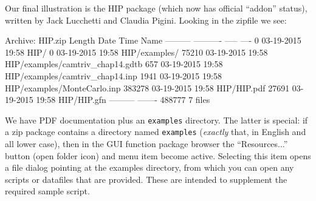 \documentclass[oneside]{book}
\begin{document}
Our final illustration is the \textsf{HIP} package (which now has
official ``addon'' status), written by Jack Lucchetti and Claudia
Pigini. Looking in the zipfile we see:

\begin{code}
Archive:  HIP.zip
  Length      Date    Time    Name
---------  ---------- -----   ----
        0  03-19-2015 19:58   HIP/
        0  03-19-2015 19:58   HIP/examples/
    75210  03-19-2015 19:58   HIP/examples/camtriv_chap14.gdtb
      657  03-19-2015 19:58   HIP/examples/camtriv_chap14.inp
     1941  03-19-2015 19:58   HIP/examples/MonteCarlo.inp
   383278  03-19-2015 19:58   HIP/HIP.pdf
    27691  03-19-2015 19:58   HIP/HIP.gfn
---------                     -------
   488777                     7 files
\end{code}

We have PDF documentation plus an \texttt{examples} directory. The
latter is special: if a zip package contains a directory named
\texttt{examples} (\textit{exactly} that, in English and all lower
case), then in the GUI function package browser the ``Resources...''
button (open folder icon) and menu item become active. Selecting this
item opens a file dialog pointing at the examples directory, from
which you can open any scripts or datafiles that are provided. These
are intended to supplement the required sample script.



\end{document}

